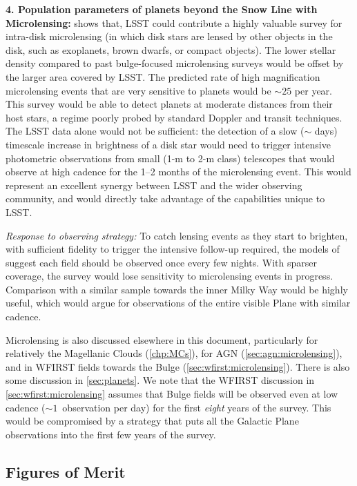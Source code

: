 {\bf 4. Population parameters of planets beyond the Snow Line with
  Microlensing:} \citet{gould13}  shows that, LSST could contribute a
highly valuable survey for intra-disk microlensing (in which disk
stars are lensed by other objects in the disk, such as exoplanets,
brown dwarfs, or compact objects). The lower stellar density compared
to past bulge-focused microlensing surveys would be offset by the
larger area covered by LSST. The predicted rate of high magnification
microlensing events that are very sensitive to planets would be $\sim
25$ per year. This survey would be able to detect planets at moderate
distances from their host stars, a regime poorly probed by standard
Doppler and transit techniques. The LSST data alone would not be
sufficient: the detection of a slow ($\sim$ days) timescale increase
in brightness of a disk star would need to trigger intensive
photometric observations from small (1-m to 2-m class) telescopes that
would observe at high cadence for the 1--2 months of the microlensing
event. This would represent an excellent synergy between LSST and the
wider observing community, and would directly take advantage of the
capabilities unique to LSST.

{\it Response to observing strategy:} To catch lensing events as they
start to brighten, with sufficient fidelity to trigger the intensive
follow-up required, the models of \citet{gould13} suggest each field
should be observed once every few nights. With sparser coverage, the
survey would lose sensitivity to microlensing events in
progress. Comparison with a similar sample towards the inner Milky Way
would be highly useful, which would argue for observations of the
entire visible Plane with similar cadence.

Microlensing is also discussed elsewhere in this document, particularly
for relatively the Magellanic Clouds (\autoref{chp:MCs}), for AGN
(\autoref{sec:agn:microlensing}), and in WFIRST fields towards the
Bulge (\autoref{sec:wfirst:microlensing}). There is also some
discussion in \autoref{sec:planets}. We note that the WFIRST
discussion in \autoref{sec:wfirst:microlensing} assumes that Bulge
fields will be observed even at low cadence ($\sim 1$~observation per
day) for the first {\it eight} years of the survey. This would be
compromised by a strategy that puts all the Galactic Plane observations
into the first few years of the survey.


\subsection{Figures of Merit}
\label{sec:\secname:MW_Disk_metrics}

